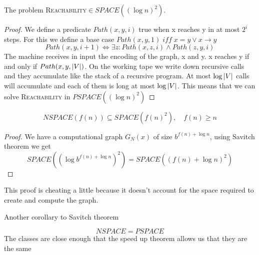 \begin{theorem}
    The problem \textsc{Reachability}$\in SPACE((\log{n})^2)$.
    \begin{proof}
        We define a predicate $Path(x,y,i)$ true when x reaches y in at most $2^i$ steps. For this we define a base case $Path(x,y,1)\; iff \; x =y \vee x \rightarrow y$
        \[ 
            Path(x,y,i+1) \Longleftrightarrow \exists z: Path(x,z,i) \wedge Path(z,y,i) 
        \]
        The machine receives in input the encoding of the graph, x and y. x reaches y if and only if $Path(x,y, \left\lvert V\right\rvert)$. On the working tape we write down recursive calls and they accumulate like the stack of a recursive program. At most $\log{\left\lvert V\right\rvert}$ calls will accumulate and each of them is long at most $\log{\left\lvert V\right\rvert}$. This means that we can solve \textsc{Reachability} in $PSPACE((\log{n})^2)$
    \end{proof}
\end{theorem}
\begin{corollary}
    \[ 
        NSPACE(f(n)) \subseteq SPACE(f(n)^2),\quad f(n) \geq n
    \]
    \begin{proof}
        We have a computational graph $G_N(x)$ of size $b^{f(n)+\log{n}}$, using Savitch theorem we get
        \[ 
            SPACE((\log{b^{f(n)+\log{n}}})^2) = SPACE((f(n)+\log{n})^2)
        \]
    \end{proof}
    This proof is cheating a little because it doesn't account for the space required to create and compute the graph.
\end{corollary}

Another corollary to Savitch theorem
\begin{corollary}
    \[ 
        NSPACE = PSPACE 
    \]
    The classes are close enough that the speed up theorem allows us that they are the same
\end{corollary}

